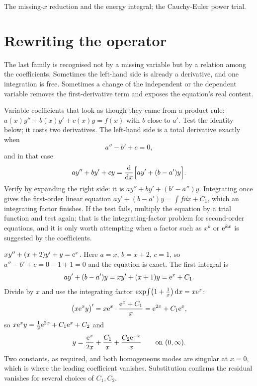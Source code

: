 \begin{seealsob}The missing-$x$ reduction and the energy integral; the Cauchy-Euler power trial.\end{seealsob}

\section{Rewriting the operator}

The last family is recognised not by a missing variable but by a relation among the coefficients. Sometimes the left-hand side is already a derivative, and one integration is free. Sometimes a change of the independent or the dependent variable removes the first-derivative term and exposes the equation's real content.

\cue Variable coefficients that look as though they came from a product rule: $a(x)y''+b(x)y'+c(x)y=f(x)$ with $b$ close to $a'$. Test the identity below; it costs two derivatives.
\method The left-hand side is a total derivative exactly when
\[a''-b'+c=0,\]
and in that case
\[a y''+by'+cy=\frac{\mathrm{d}}{\mathrm{d}x}\Bigl[a y'+(b-a')y\Bigr].\]
Verify by expanding the right side: it is $ay''+by'+(b'-a'')y$. Integrating once gives the first-order linear equation $ay'+(b-a')y=\int f\dd x+C_1$, which an integrating factor finishes. If the test fails, multiply the equation by a trial function and test again; that is the integrating-factor problem for second-order equations, and it is only worth attempting when a factor such as $x^{k}$ or $\mathrm{e}^{kx}$ is suggested by the coefficients.

\begin{worked}
$xy''+(x+2)y'+y=\mathrm{e}^{x}$. Here $a=x$, $b=x+2$, $c=1$, so $a''-b'+c=0-1+1=0$ and the equation is exact. The first integral is
\[a y'+(b-a')y=xy'+(x+1)y=\mathrm{e}^{x}+C_1.\]
Divide by $x$ and use the integrating factor $\exp\!\int\bigl(1+\tfrac1x\bigr)\,\mathrm{d} x=x\mathrm{e}^{x}$:
\[\bigl(x\mathrm{e}^{x}y\bigr)'=x\mathrm{e}^{x}\cdot\frac{\mathrm{e}^{x}+C_1}{x}=\mathrm{e}^{2x}+C_1\mathrm{e}^{x},\]
so $x\mathrm{e}^{x}y=\tfrac12\mathrm{e}^{2x}+C_1\mathrm{e}^{x}+C_2$ and
\[y=\frac{\mathrm{e}^{x}}{2x}+\frac{C_1}{x}+\frac{C_2\mathrm{e}^{-x}}{x}\qquad\text{on }(0,\infty).\]
Two constants, as required, and both homogeneous modes are singular at $x=0$, which is where the leading coefficient vanishes. Substitution confirms the residual vanishes for several choices of $C_1,C_2$.
\end{worked}

